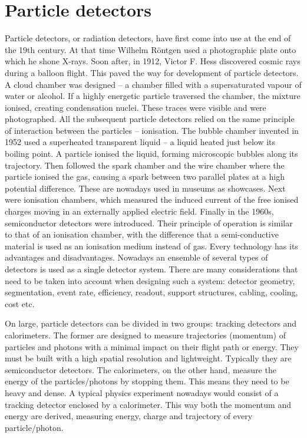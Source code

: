 \documentclass[twoside,12pt]{packages/mytustyle}  %
\begin{document}
\section{Particle detectors}
Particle detectors, or radiation detectors, have first come into use at the end of the 19th century. At that time Wilhelm R\"ontgen used a photographic plate onto which he shone X-rays. Soon after, in 1912, Victor F. Hess discovered cosmic rays during a balloon flight. This paved the way for development of particle detectors. A cloud chamber was designed -- a chamber filled with a supersaturated vapour of water or alcohol. If a highly energetic particle traversed the chamber, the mixture ionised, creating condensation nuclei. These traces were visible and were photographed. All the subsequent particle detectors relied on the same principle of interaction between the particles -- ionisation. The bubble chamber invented in 1952 used a superheated transparent liquid -- a liquid heated just below its boiling point. A particle ionised the liquid, forming microscopic bubbles along its trajectory. Then followed the spark chamber and the wire chamber where the particle ionised the gas, causing a spark between two parallel plates at a high potential difference. These are nowadays used in museums as showcases. Next were ionisation chambers, which measured the induced current of the free ionised charges moving in an externally applied electric field. Finally in the 1960s, semiconductor detectors were introduced. Their principle of operation is similar to that of an ionisation chamber, with the difference that a semi-conductive material is used as an ionisation medium instead of gas. Every technology has its advantages and disadvantages. Nowadays an ensemble of several types of detectors is used as a single detector system. There are many considerations that need to be taken into account when designing such a system: detector geometry, segmentation, event rate, efficiency, readout, support structures, cabling, cooling, cost etc.

On large, particle detectors can be divided in two groups: tracking detectors and calorimeters. The former are designed to measure trajectories (momentum) of particles and photons with a minimal impact on their flight path or energy. They must be built with a high spatial resolution and lightweight. Typically they are semiconductor detectors. The calorimeters, on the other hand, measure the energy of the particles/photons by stopping them. This means they need to be heavy and dense. A typical physics experiment nowadays would consist of a tracking detector enclosed by a calorimeter. This way both the momentum and energy are derived, measuring energy, charge and trajectory of every particle/photon.
\end{document}
